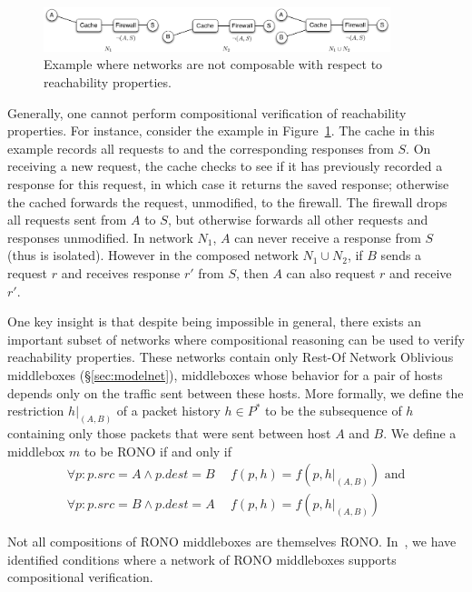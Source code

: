 \begin{figure}
\centering
\includegraphics[width=0.9\textwidth]{figures/rono_example.pdf}
\caption{Example where networks are not composable with respect to reachability properties.}
\label{fig:compose_fail}
\vspace{-0.15in}
\end{figure}

Generally, one cannot perform compositional verification of reachability properties. For instance,
consider the example in Figure~\ref{fig:compose_fail}. The cache in this example records all requests to and the corresponding responses from $S$.
On receiving a new request,  the cache checks to see if it has previously recorded a response for this request, in which case it returns the saved response;
otherwise the cached forwards the request, unmodified, to the firewall.
 The firewall drops all requests sent from $A$ to $S$, but otherwise forwards all other requests and responses unmodified.
In network $N_1$, $A$ can never receive a response from $S$ (thus is isolated). However in the composed network $N_1\cup N_2$, if $B$ sends a request $r$ and
receives response $r'$ from $S$, then $A$ can also request $r$ and receive $r'$.

One key insight is that despite being impossible in general, there exists an important subset of networks where compositional reasoning can be used
to verify reachability properties. These networks contain only Rest-Of
Network Oblivious middleboxes (\S\ref{sec:modelnet}), middleboxes whose behavior for a pair of hosts depends only on the traffic sent between these hosts.
More formally, we define the restriction $h|_{(A, B)}$ of a packet history $h\in P^*$ to be the subsequence of $h$ containing only those packets that were
sent between host $A$ and $B$. We define a middlebox $m$ to be RONO if and only if
\begin{align*}
\forall p: p.src = A \land p.dest = B &\ \  f(p, h) = f(p, h|_{(A, B)}) \text{   and}\\
\forall p: p.src = B \land p.dest = A &\ \ f(p, h) = f(p, h|_{(A, B)})
\end{align*}

Not all compositions of RONO middleboxes are themselves RONO. In~\cite{corr:PandaLASS14}, we have identified conditions where a network of RONO middleboxes
supports compositional verification.
